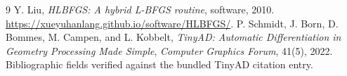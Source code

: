 \documentclass[11pt]{article}
\begin{document}
\begin{thebibliography}{9}
 Y. Liu, \emph{HLBFGS: A hybrid L-BFGS routine}, software, 2010. \url{https://xueyuhanlang.github.io/software/HLBFGS/}.
 P. Schmidt, J. Born, D. Bommes, M. Campen, and L. Kobbelt, \emph{TinyAD: Automatic Differentiation in Geometry Processing Made Simple}, \emph{Computer Graphics Forum}, 41(5), 2022. Bibliographic fields verified against the bundled TinyAD citation entry.
\end{thebibliography}
\end{document}
